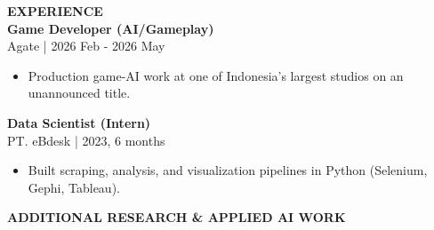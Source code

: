 \documentclass[11pt,a4paper]{article}
\newcommand{\mainsection}[1]{%
    {\large\bfseries\MakeUppercase{#1}}\\[8pt]%
}
\newcommand{\jobentry}[2]{%
    \textbf{#1}\\
    {\small\color{lighttext}#2}\\[4pt]%
}
\begin{document}
\begin{minipage}[t]{14cm}
\begin{minipage}[t]{12.5cm}
\vspace{0.5cm}

\mainsection{Experience}

\jobentry{Game Developer (AI/Gameplay)}{Agate | 2026 Feb - 2026 May}
\begin{itemize}[leftmargin=*, nosep, itemsep=2pt, topsep=2pt]
    \item Production game-AI work at one of Indonesia's largest studios on an unannounced title.
\end{itemize}

\vspace{0.3cm}

\jobentry{Data Scientist (Intern)}{PT. eBdesk | 2023, 6 months}
\begin{itemize}[leftmargin=*, nosep, itemsep=2pt, topsep=2pt]
    \item Built scraping, analysis, and visualization pipelines in Python (Selenium, Gephi, Tableau).
\end{itemize}

\end{minipage}
\end{minipage}

\newpage


\vspace{1.2cm}

\begin{center}
{\large\bfseries\MakeUppercase{Additional Research \& Applied AI Work}}
\end{center}

\vspace{0.5cm}
\end{document}
